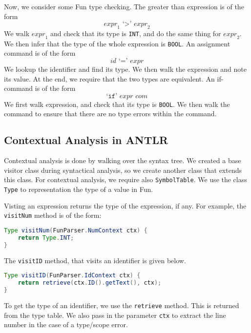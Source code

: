 \documentclass[a4paper, openany]{memoir}
\begin{document}
Now, we consider some Fun type checking. The greater than expression is of the form
\[\textit{expr}_1 \text{ `}\texttt{>}\text{' } \textit{expr}_2\]
We walk $\textit{expr}_1$ and check that its type is \texttt{INT}, and do the same thing for $\textit{expr}_2$. We then infer that the type of the whole expression is \texttt{BOOL}. An assignment command is of the form
\[\textit{id } \text{`}\texttt{=}\text{'} \textit{ expr}\]
We lookup the identifier and find its type. We then walk the expression and note its value. At the end, we require that the two types are equivalent. An if-command is of the form
\[\text{`}\texttt{if}\text{' } \textit{expr com}\]
We first walk expression, and check that its type is \texttt{BOOL}. We then walk the command to ensure that there are no type errors within the command.

\subsection{Contextual Analysis in ANTLR}
Contextual analysis is done by walking over the syntax tree. We created a base visitor class during syntactical analysis, so we create another class that extends this class. For contextual analysis, we require also \texttt{SymbolTable}. We use the class \texttt{Type} to representation the type of a value in Fun.

Visting an expression returns the type of the expression, if any. For example, the \texttt{visitNum} method is of the form:
\begin{lstlisting}[language=java]
Type visitNum(FunParser.NumContext ctx) {
    return Type.INT;
}
\end{lstlisting}
The \texttt{visitID} method, that visits an identifier is given below.
\begin{lstlisting}[language=java]
Type visitID(FunParser.IdContext ctx) {
    return retrieve(ctx.ID().getText(), ctx);
}
\end{lstlisting}
To get the type of an identifier, we use the \texttt{retrieve} method. This is returned from the type table. We also pass in the parameter \texttt{ctx} to extract the line number in the case of a type/scope error.
\end{document}
